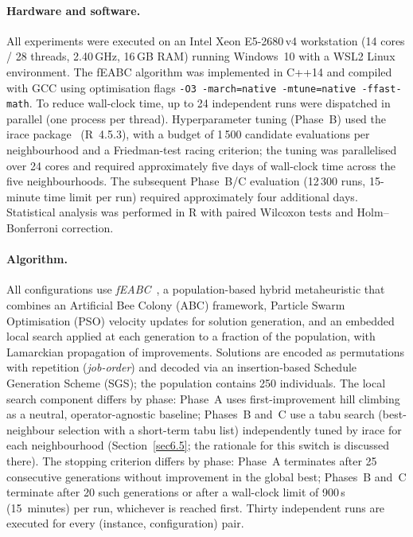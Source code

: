 \documentclass[preprint,12pt]{elsarticle}
\begin{document}
\paragraph{Hardware and software.} All experiments were executed on an Intel Xeon E5-2680\,v4 workstation (14 cores / 28 threads, 2.40\,GHz, 16\,GB RAM) running Windows~10 with a WSL2 Linux environment. The fEABC algorithm was implemented in C++14 and compiled with GCC using optimisation flags \texttt{-O3 -march=native -mtune=native -ffast-math}. To reduce wall-clock time, up to 24 independent runs were dispatched in parallel (one process per thread). Hyperparameter tuning (Phase~B) used the irace package~\cite{Lopez2016} (R~4.5.3), with a budget of 1\,500 candidate evaluations per neighbourhood and a Friedman-test racing criterion; the tuning was parallelised over 24 cores and required approximately five days of wall-clock time across the five neighbourhoods. The subsequent Phase~B/C evaluation (12\,300 runs, 15-minute time limit per run) required approximately four additional days. Statistical analysis was performed in R with paired Wilcoxon tests and Holm--Bonferroni correction.

\paragraph{Algorithm.} All configurations use \emph{fEABC}~\cite{DiazFEABC2023}, a population-based hybrid metaheuristic that combines an Artificial Bee Colony (ABC) framework, Particle Swarm Optimisation (PSO) velocity updates for solution generation, and an embedded local search applied at each generation to a fraction of the population, with Lamarckian propagation of improvements. Solutions are encoded as permutations with repetition (\emph{job-order}) and decoded via an insertion-based Schedule Generation Scheme (SGS); the population contains 250 individuals. The local search component differs by phase: Phase~A uses first-improvement hill climbing as a neutral, operator-agnostic baseline; Phases~B and~C use a tabu search (best-neighbour selection with a short-term tabu list) independently tuned by irace for each neighbourhood (Section~\ref{sec6.5}; the rationale for this switch is discussed there). The stopping criterion differs by phase: Phase~A terminates after 25 consecutive generations without improvement in the global best; Phases~B and~C terminate after 20 such generations or after a wall-clock limit of 900\,s (15~minutes) per run, whichever is reached first. Thirty independent runs are executed for every (instance, configuration) pair.
\end{document}
